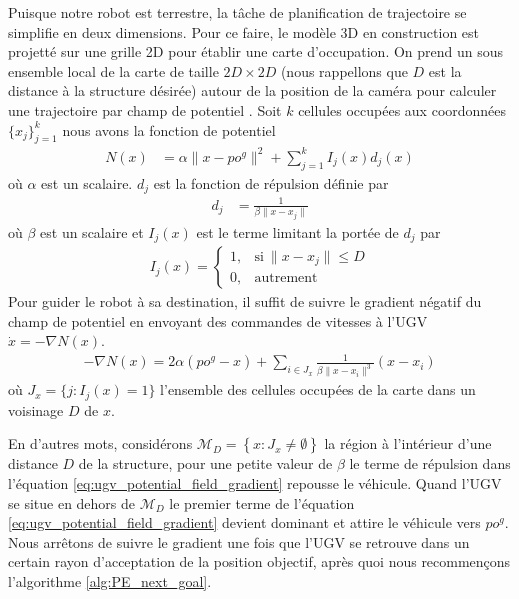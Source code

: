 Puisque notre robot est terrestre, la tâche de planification de trajectoire se simplifie en deux dimensions. Pour ce faire, le modèle 3D en construction est projetté sur une grille 2D pour établir une carte d'occupation. On prend un sous ensemble local de la carte de taille $2D \times 2D$ (nous rappellons que $D$ est la distance à la structure désirée) autour de la position de la caméra pour calculer une trajectoire par champ de potentiel \citep{Khatib1990, Choset2005}. Soit $k$ cellules occupées aux coordonnées $\{x_j\}^k_{j=1}$ nous avons la fonction de potentiel
\begin{align}
  N(x) &= \alpha \| x - {po}^g \|^2 + \sum^k_{j=1} I_j(x)d_j(x)
\end{align}
où $\alpha$ est un scalaire. $d_j$ est la fonction de répulsion définie par
\begin{align}
  d_j &= \frac{1}{\beta \| x - x_j \|}
\end{align}
où $\beta$ est un scalaire et $I_j(x)$ est le terme limitant la portée de $d_j$ par
\begin{align}
  I_j(x) =     \begin{cases}
      1, & \text{si}\ \|x - x_j\| \leq D \\
      0, & \text{autrement}
    \end{cases}
\end{align}
Pour guider le robot à sa destination, il suffit de suivre le gradient négatif du champ de potentiel en envoyant des commandes de vitesses à l'UGV $\dot x = -\nabla N(x)$.
\begin{align}
  - \nabla N(x) = 2 \alpha ({po}^g - x) + \sum_{i \in J_x}\frac{1}{\beta \| x - x_i\|^3}(x - x_i)
  \label{eq:ugv_potential_field_gradient}
\end{align}
où $J_x = \{ j : I_j(x) = 1\}$ l'ensemble des cellules occupées de la carte dans un voisinage $D$ de $x$.

En d'autres mots, considérons $\mathcal M_D = \left\lbrace x : J_{x} \neq \emptyset \right\rbrace $ la région à l'intérieur d'une distance $D$ de la structure, pour une petite valeur de $\beta$ le terme de répulsion dans l'équation \ref{eq:ugv_potential_field_gradient} repousse le véhicule. Quand l'UGV se situe en dehors de $\mathcal M_D$ le premier terme de l'équation \ref{eq:ugv_potential_field_gradient} devient dominant et attire le véhicule vers $po^g$. Nous arrêtons de suivre le gradient une fois que l'UGV se retrouve dans un certain rayon d'acceptation de la position objectif, après quoi nous recommençons l'algorithme \ref{alg:PE_next_goal}.

